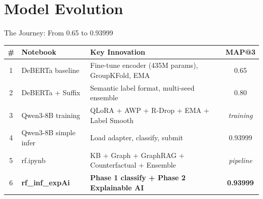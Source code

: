 \documentclass[aspectratio=169]{beamer}
\begin{document}
\section{Model Evolution}

\begin{frame}{The Journey: From 0.65 to 0.93999}
\small
\setlength{\tabcolsep}{4pt}
\renewcommand{\arraystretch}{1.3}
\begin{center}
\begin{tabular}{clp{5.2cm}c}
\toprule
\textbf{\#} & \textbf{Notebook} & \textbf{Key Innovation} & \textbf{MAP@3}\\
\midrule
\rowcolor{RowTintA}
1 & DeBERTa baseline & Fine-tune encoder (435M params), GroupKFold, EMA & 0.65\\
\rowcolor{RowTintB}
2 & DeBERTa + Suffix & Semantic label format, multi-seed ensemble & 0.80\\
\rowcolor{RowTintA}
3 & Qwen3-8B training & QLoRA + AWP + R-Drop + EMA + Label Smooth & \textit{training}\\
\rowcolor{RowTintB}
4 & Qwen3-8B simple infer & Load adapter, classify, submit & 0.93999\\
\rowcolor{LightBlue}
5 & rf.ipynb & KB + Graph + GraphRAG + Counterfactual + Ensemble & \textit{pipeline}\\
\rowcolor{LightGreen}
6 & \textbf{rf\_inf\_expAi} & \textbf{Phase 1 classify + Phase 2 Explainable AI} & \textbf{0.93999}\\
\bottomrule
\end{tabular}
\end{center}
\vspace{6pt}
\begin{center}
\end{center}
\end{frame}
\end{document}
